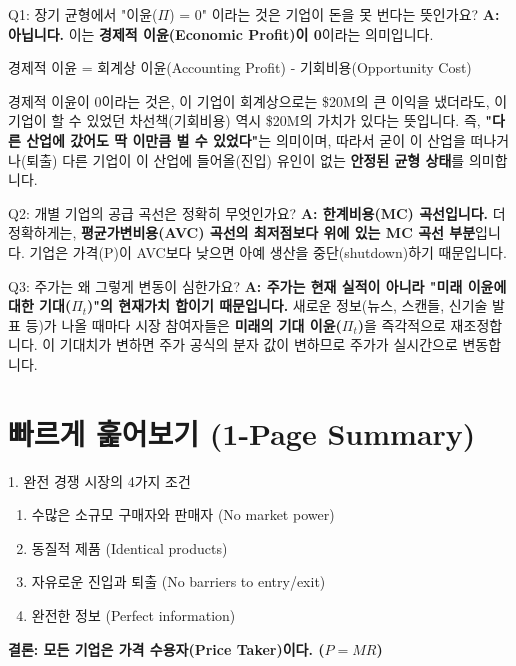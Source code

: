 \documentclass[11pt,a4paper]{book}
\theoremstyle{definition}
\begin{document}
\begin{tcolorbox}{Q1: 장기 균형에서 "이윤($\Pi$) = 0" 이라는 것은 기업이 돈을 못 번다는 뜻인가요?}
\textbf{A: 아닙니다.} 이는 \textbf{경제적 이윤(Economic Profit)이 0}이라는 의미입니다.

경제적 이윤 = 회계상 이윤(Accounting Profit) - 기회비용(Opportunity Cost)

경제적 이윤이 0이라는 것은, 이 기업이 회계상으로는 \$20M의 큰 이익을 냈더라도, 이 기업이 할 수 있었던 차선책(기회비용) 역시 \$20M의 가치가 있다는 뜻입니다.
즉, \textbf{"다른 산업에 갔어도 딱 이만큼 벌 수 있었다"}는 의미이며, 따라서 굳이 이 산업을 떠나거나(퇴출) 다른 기업이 이 산업에 들어올(진입) 유인이 없는 \textbf{안정된 균형 상태}를 의미합니다.
\end{tcolorbox}

\begin{tcolorbox}{Q2: 개별 기업의 공급 곡선은 정확히 무엇인가요?}
\textbf{A: 한계비용(MC) 곡선입니다.}
더 정확하게는, \textbf{평균가변비용(AVC) 곡선의 최저점보다 위에 있는 MC 곡선 부분}입니다.
기업은 가격(P)이 AVC보다 낮으면 아예 생산을 중단(shutdown)하기 때문입니다.
\end{tcolorbox}

\begin{tcolorbox}{Q3: 주가는 왜 그렇게 변동이 심한가요?}
\textbf{A: 주가는 현재 실적이 아니라 "미래 이윤에 대한 기대($\Pi_t$)"의 현재가치 합이기 때문입니다.}
새로운 정보(뉴스, 스캔들, 신기술 발표 등)가 나올 때마다 시장 참여자들은 \textbf{미래의 기대 이윤($\Pi_t$)}을 즉각적으로 재조정합니다. 이 기대치가 변하면 주가 공식의 분자 값이 변하므로 주가가 실시간으로 변동합니다.
\end{tcolorbox}


\section{빠르게 훑어보기 (1-Page Summary)}

\begin{mybox}{1. 완전 경쟁 시장의 4가지 조건}
\begin{enumerate}
    \item 수많은 소규모 구매자와 판매자 (No market power)
    \item 동질적 제품 (Identical products)
    \item 자유로운 진입과 퇴출 (No barriers to entry/exit)
    \item 완전한 정보 (Perfect information)
\end{enumerate}
\textbf{결론: 모든 기업은 가격 수용자(Price Taker)이다. ($P = MR$)}
\end{mybox}
\end{document}
